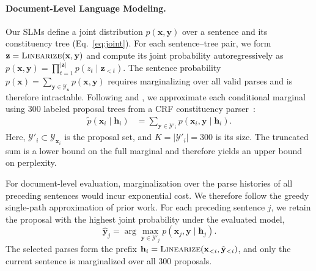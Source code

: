 \documentclass[11pt]{article}
\begin{document}
\paragraph{Document-Level Language Modeling.}
\label{sec:doc-ppl}
Our SLMs define a joint distribution $p(\mathbf{x}, \mathbf{y})$ over a sentence and its constituency tree (Eq.~\ref{eq:joint}).
For each sentence--tree pair, we form $\mathbf{z}=\textsc{Linearize}(\mathbf{x},\mathbf{y})$ and compute its joint probability autoregressively as $p(\mathbf{x},\mathbf{y})=\prod_{t=1}^{|\mathbf{z}|}p(z_t\mid\mathbf{z}_{<t})$.
The sentence probability $p(\mathbf{x})=\sum_{\mathbf{y}\in\mathcal{Y}_{\mathbf{x}}}p(\mathbf{x},\mathbf{y})$ requires marginalizing over all valid parses and is therefore intractable.
Following \citet{sartran-etal-2022-transformer} and \citet{zhao-etal-2025-systematic}, we approximate each conditional marginal using 300 labeled proposal trees from a CRF constituency parser~\cite{kitaev-klein-2018-constituency}:
\begin{align}
\widetilde p(\mathbf{x}_i \mid \mathbf{h}_i)
&= \sum_{\mathbf{y} \in \mathcal{Y}'_i}
p(\mathbf{x}_i,\mathbf{y} \mid \mathbf{h}_i).
\label{eq:marginal}
\end{align}
\noindent Here, $\mathcal{Y}'_i\subset\mathcal{Y}_{\mathbf{x}_i}$ is the proposal set, and $K=|\mathcal{Y}'_i|=300$ is its size. The truncated sum is a lower bound on the full marginal and therefore yields an upper bound on perplexity.

For document-level evaluation, marginalization over the parse histories of all preceding sentences would incur exponential cost.
We therefore follow the greedy single-path approximation of prior work.
For each preceding sentence $j$, we retain the proposal with the highest joint probability under the evaluated model,
\begin{equation}
\hat{\mathbf{y}}_j=\arg\max_{\mathbf{y}\in\mathcal{Y}'_j}p(\mathbf{x}_j,\mathbf{y}\mid\mathbf{h}_j).
\end{equation}
The selected parses form the prefix $\mathbf{h}_i=\textsc{Linearize}(\mathbf{x}_{<i},\hat{\mathbf{y}}_{<i})$, and only the current sentence is marginalized over all 300 proposals.
\end{document}
